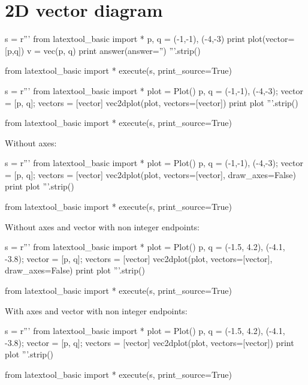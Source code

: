 \section{2D vector diagram}

\begin{python}
s = r'''
from latextool_basic import *
p, q = (-1,-1), (-4,-3)
print plot(vector=[p,q])
v = vec(p, q)
print answer(answer='')
'''.strip()

from latextool_basic import *
execute(s, print_source=True)
\end{python}

\begin{python}
s = r'''
from latextool_basic import *
plot = Plot()
p, q = (-1,-1), (-4,-3); vector = [p, q]; vectors = [vector]
vec2dplot(plot, vectors=[vector])
print plot
'''.strip()

from latextool_basic import *
execute(s, print_source=True)
\end{python}

Without axes:
\begin{python}
s = r'''
from latextool_basic import *
plot = Plot()
p, q = (-1,-1), (-4,-3); vector = [p, q]; vectors = [vector]
vec2dplot(plot, vectors=[vector], draw_axes=False)
print plot
'''.strip()

from latextool_basic import *
execute(s, print_source=True)
\end{python}

\newpage
Without axes and vector with non integer endpoints:
\begin{python}
s = r'''
from latextool_basic import *
plot = Plot()
p, q = (-1.5, 4.2), (-4.1, -3.8); vector = [p, q]; vectors = [vector]
vec2dplot(plot, vectors=[vector], draw_axes=False)
print plot
'''.strip()

from latextool_basic import *
execute(s, print_source=True)
\end{python}


\newpage
With axes and vector with non integer endpoints:
\begin{python}
s = r'''
from latextool_basic import *
plot = Plot()
p, q = (-1.5, 4.2), (-4.1, -3.8); vector = [p, q]; vectors = [vector]
vec2dplot(plot, vectors=[vector])
print plot
'''.strip()

from latextool_basic import *
execute(s, print_source=True)
\end{python}
